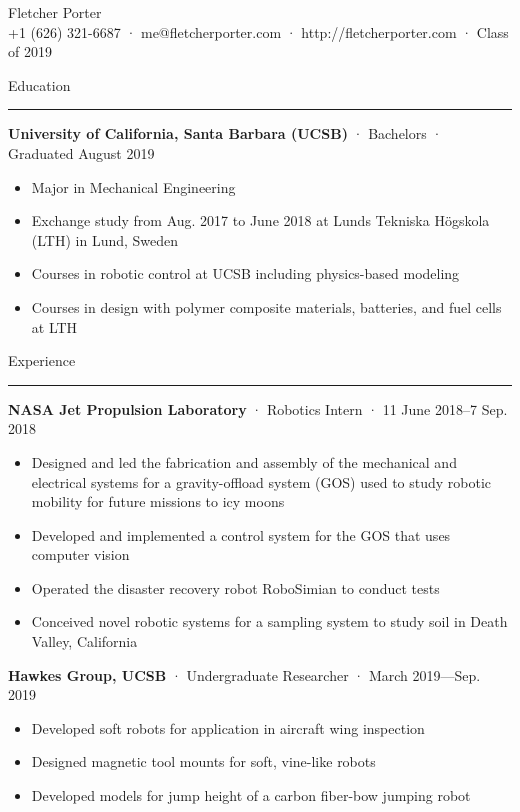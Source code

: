 \documentclass[12pt, oneside]{article}
\newcommand{\titlestyle}[1] {
	{\fontsize{50pt}{1em}\selectfont \textcolor{new_red}{\textsf{#1}}} \\
}
\newcommand{\headingstyleJobs}[1] {
	{\fontsize{19pt}{1em}\selectfont \textcolor{new_red}{\textsf{#1}}}
	\textcolor{new_red}{\rule{3.25in}{0.5pt}} \vspace{3pt}
}
\newcommand{\infostyle}[1] {
	{\fontsize{9pt}{1em}\selectfont #1} \\ \vspace{10pt}
}
\newcommand{\jobtitle}[3] {
	{\bf #1} · {#2} · {#3} \vspace{-10pt} \\
}
\begin{document}
\begin{flushleft}



\titlestyle{Fletcher Porter}
\infostyle{+1 (626) 321-6687 · me@fletcherporter.com · http://fletcherporter.com · Class of 2019}


\headingstyleJobs{Education}

\jobtitle{University of California, Santa Barbara (UCSB)}{Bachelors}{Graduated August 2019}
\begin{itemize}
	\item Major in Mechanical Engineering \\
	\item Exchange study from Aug. 2017 to June 2018 at Lunds Tekniska Högskola (LTH) in Lund, Sweden \\
	\item Courses in robotic control at UCSB including physics-based modeling \\
	\item Courses in design with polymer composite materials, batteries, and fuel cells at LTH
\end{itemize}


\headingstyleJobs{Experience}

\jobtitle{NASA Jet Propulsion Laboratory}{Robotics Intern}{11 June 2018–7 Sep. 2018}
\begin{itemize}
	\item Designed and led the fabrication and assembly of the mechanical and electrical systems for a gravity-offload system (GOS)  used to study robotic mobility for future missions to icy moons \\
	\item Developed and implemented a control system for the GOS that uses computer vision \\
	\item Operated the disaster recovery robot RoboSimian to conduct tests \\
	\item Conceived novel robotic systems for a sampling system to study soil in Death Valley, California
\end{itemize}

\jobtitle{Hawkes Group, UCSB}{Undergraduate Researcher}{March 2019—Sep. 2019}
\begin{itemize}
	\item Developed soft robots for application in aircraft wing inspection \\
	\item Designed magnetic tool mounts for soft, vine-like robots \\
	\item Developed models for jump height of a carbon fiber-bow jumping robot
\end{itemize}


\end{flushleft}
\end{document}
